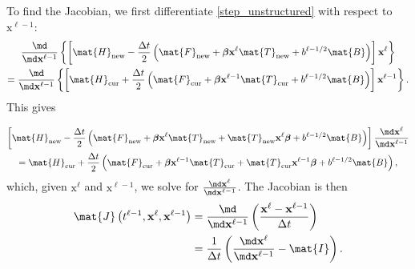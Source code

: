 \documentclass{jpmarticle}
\renewcommand{\vec}[1]{\boldsymbol{\mathrm{#1}}}
\let\subequationsorig\subequations%
\let\endsubequationsorig\endsubequations%
\renewenvironment{subequations}{
  \subequationsorig
  \renewcommand{\theequation}{\theparentequation.\arabic{equation}}
}{
  \endsubequationsorig
}
\begin{document}
To find the Jacobian, we first differentiate \eqref{step_unstructured}
with respect to $\vec{x}^{\ell - 1}$:
\begin{multline}
  \frac{\md}{\md \vec{x}^{\ell - 1}}
  \left\{
    \left[
      \mat{H}_{\mathrm{new}}
      - \frac{\Delta t}{2}
      \left(
        \mat{F}_{\mathrm{new}}
        + \vec{\beta} \vec{x}^{\ell} \mat{T}_{\mathrm{new}}
        + b^{\ell - 1 / 2} \mat{B}
      \right)
    \right]
    \vec{x}^{\ell}
  \right\}
  \\
  = \frac{\md}{\md \vec{x}^{\ell - 1}}
  \left\{
    \left[
      \mat{H}_{\mathrm{cur}}
      + \frac{\Delta t}{2}
      \left(
        \mat{F}_{\mathrm{cur}}
        + \vec{\beta} \vec{x}^{\ell - 1} \mat{T}_{\mathrm{cur}}
        + b^{\ell - 1 / 2} \mat{B}
      \right)
    \right]
    \vec{x}^{\ell - 1}
  \right\}.
\end{multline}
This gives
\begin{subequations}
  \label{jacobian}
  \begin{multline}
    \left[
      \mat{H}_{\mathrm{new}}
      - \frac{\Delta t}{2}
      \left(
        \mat{F}_{\mathrm{new}}
        + \vec{\beta} \vec{x}^{\ell} \mat{T}_{\mathrm{new}}
        + \mat{T}_{\mathrm{new}} \vec{x}^{\ell} \vec{\beta}
        + b^{\ell - 1 / 2} \mat{B}
      \right)
    \right]
    \frac{\md \vec{x}^{\ell}}{\md \vec{x}^{\ell - 1}}
    \\
    = \mat{H}_{\mathrm{cur}}
    + \frac{\Delta t}{2}
    \left(
      \mat{F}_{\mathrm{cur}}
      + \vec{\beta} \vec{x}^{\ell - 1} \mat{T}_{\mathrm{cur}}
      + \mat{T}_{\mathrm{cur}} \vec{x}^{\ell - 1} \vec{\beta}
      + b^{\ell - 1 / 2} \mat{B}
    \right),
  \end{multline}
  which, given $\vec{x}^{\ell}$ and $\vec{x}^{\ell - 1}$,
  we solve for $\frac{\md \vec{x}^{\ell}}{\md \vec{x}^{\ell - 1}}$.
  The Jacobian is then
  \begin{equation}
    \begin{split}
      \mat{J}\left(t^{\ell - 1}, \vec{x}^{\ell}, \vec{x}^{\ell - 1}\right)
      &= \frac{\md}{\md \vec{x}^{\ell - 1}}
      \left(
        \frac{\vec{x}^{\ell} - \vec{x}^{\ell - 1}}{\Delta t}
      \right)
      \\
      &= \frac{1}{\Delta t} \left(
        \frac{\md \vec{x}^{\ell}}{\md \vec{x}^{\ell - 1}}
        - \mat{I}
      \right).
    \end{split}
  \end{equation}
\end{subequations}
\end{document}
